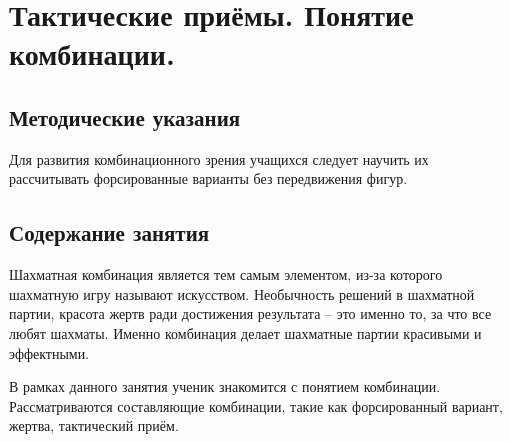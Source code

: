 \chapter{Тактические приёмы. Понятие комбинации.}

\section{Методические указания}

Для развития комбинационного зрения учащихся следует научить их рассчитывать форсированные варианты без передвижения фигур.

\section{Содержание занятия}

Шахматная комбинация является тем самым элементом, из-за которого шахматную игру называют искусством. Необычность решений в шахматной партии, красота жертв ради достижения результата – это именно то, за что все любят шахматы. Именно комбинация делает шахматные партии красивыми и эффектными.

В рамках данного занятия ученик знакомится с понятием комбинации. Рассматриваются составляющие комбинации, такие как форсированный вариант, жертва, тактический приём.

